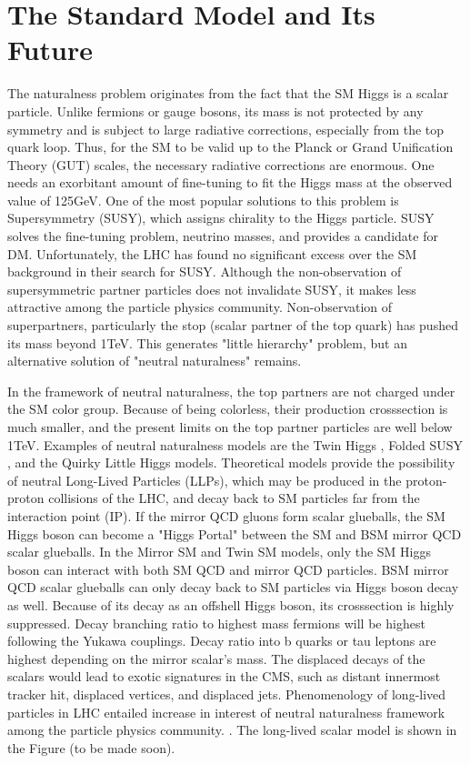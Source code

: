 \chapter{The Standard Model and Its Future}\label{sec:theory}



The naturalness problem originates from the fact that the SM Higgs is a scalar particle. 
Unlike fermions or gauge bosons, its mass is not protected by any symmetry and is subject to large radiative corrections, especially from the top quark loop. 
Thus, for the SM to be valid up to the Planck or Grand Unification Theory (GUT) scales, the necessary radiative corrections are enormous. 
One needs an exorbitant amount of fine-tuning to fit the Higgs mass at the observed value of 125GeV.
One of the most popular solutions to this problem is Supersymmetry (SUSY), which assigns chirality to the Higgs particle. 
SUSY solves the fine-tuning problem, neutrino masses, and provides a candidate for DM. 
Unfortunately, the LHC has found no significant excess over the SM background in their search for SUSY\cite{SUSY}. 
Although the non-observation of supersymmetric partner particles does not invalidate SUSY, it makes less attractive among the particle physics community. 
Non-observation of superpartners, particularly the stop (scalar partner of the top quark) has pushed its mass beyond 1TeV. 
This generates "little hierarchy" problem, but an alternative solution of "neutral naturalness" remains. 

In the framework of neutral naturalness, the top partners are not charged under the SM color group. 
Because of being colorless, their production crosssection is much smaller, and the present limits on the top partner particles are well below 1TeV. 
Examples of neutral naturalness models are the Twin Higgs \cite{Chacko:2005pe},
Folded SUSY \cite{Burdman:2006tz}, and the Quirky Little Higgs \cite{Cai:2008au} models.
Theoretical models provide the possibility of neutral Long-Lived Particles (LLPs), which may be produced in the proton-proton
collisions of the LHC, and decay back to SM particles far from the interaction point (IP).\cite{Craig:2015pha}
If the mirror QCD gluons form scalar glueballs, the SM Higgs boson can become a "Higgs Portal" between the SM and BSM mirror QCD scalar glueballs. 
In the Mirror SM and Twin SM models, only the SM Higgs boson can interact with both SM QCD and mirror QCD particles.
BSM mirror QCD scalar glueballs can only decay back to SM particles via Higgs boson decay as well. 
Because of its decay as an offshell Higgs boson, its crosssection is highly suppressed. 
Decay branching ratio to highest mass fermions will be highest following the Yukawa couplings.
Decay ratio into b quarks or tau leptons are highest depending on the mirror scalar's mass.
The displaced decays of the scalars would lead to exotic signatures in the CMS, such as distant innermost tracker hit, displaced vertices, and displaced jets.
Phenomenology of long-lived particles in LHC entailed increase in interest of neutral naturalness framework among the particle physics community. \cite{Curtin:2015fna,Csaki:2015fba}.
The long-lived scalar model is shown in the Figure (to be made soon).

